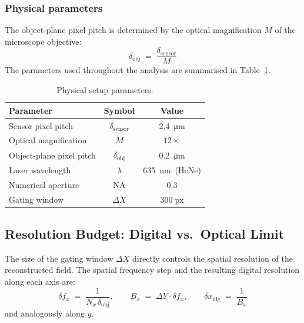 \subsubsection*{Physical parameters}
The object-plane pixel pitch is determined by the optical magnification
$M$ of the microscope objective:
\begin{equation}
    \delta_\text{obj} \;=\; \frac{\delta_\text{sensor}}{M}
\end{equation}
The parameters used throughout the analysis are summarised in
Table~\ref{tab:setup_params}.

\begin{table}[h!]
    \centering
    \caption{Physical setup parameters.}
    \label{tab:setup_params}
    \begin{tabular}{lcc}
        \hline
        \textbf{Parameter} & \textbf{Symbol} & \textbf{Value} \\
        \hline
        Sensor pixel pitch     & $\delta_\text{sensor}$ & \SI{2.4}{\micro\meter} \\
        Optical magnification  & $M$                    & $12\times$ \\
        Object-plane pixel pitch & $\delta_\text{obj}$  & \SI{0.2}{\micro\meter} \\
        Laser wavelength       & $\lambda$              & \SI{635}{\nano\meter}\ (HeNe) \\
        Numerical aperture     & NA                     & $0.3$ \\
        Gating window          & $\Delta X$             & $300\;\text{px}$ \\
        \hline
    \end{tabular}
\end{table}

\subsection{Resolution Budget: Digital vs.\ Optical Limit}
\label{sec:resolution_budget}

The size of the gating window $\Delta X$ directly controls the spatial
resolution of the reconstructed field.
The spatial frequency step and the resulting digital resolution along each
axis are:
\begin{equation}
    \delta f_x \;=\; \frac{1}{N_x\,\delta_\text{obj}}, \qquad
    B_x \;=\; \Delta Y \cdot \delta f_x, \qquad
    \delta x_\text{dig} \;=\; \frac{1}{B_x}
    \label{eq:digital_resolution}
\end{equation}
and analogously along $y$.

